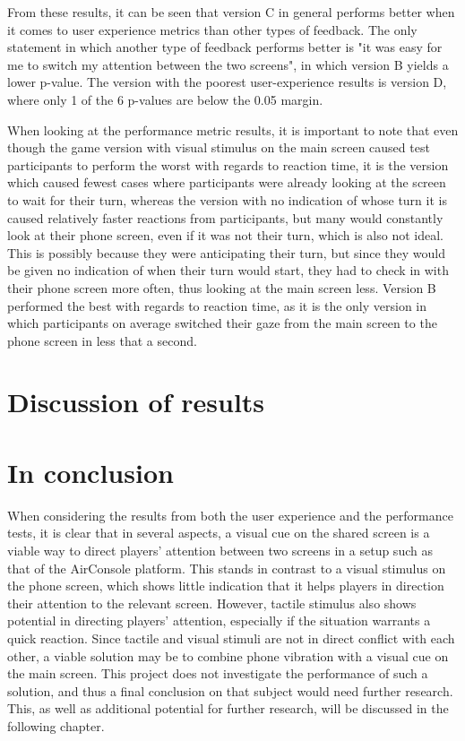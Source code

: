 From these results, it can be seen that version C in general performs better when it comes to user experience metrics than other types of feedback. The only statement in which another type of feedback performs better is "it was easy for me to switch my attention between the two screens", in which version B yields a lower p-value. The version with the poorest user-experience results is version D, where only 1 of the 6 p-values are below the 0.05 margin.

When looking at the performance metric results, it is important to note that even though the game version with visual stimulus on the main screen caused test participants to perform the worst with regards to reaction time, it is the version which caused fewest cases where participants were already looking at the screen to wait for their turn, whereas the version with no indication of whose turn it is caused relatively faster reactions from participants, but many would constantly look at their phone screen, even if it was not their turn, which is also not ideal. This is possibly because they were anticipating their turn, but since they would be given no indication of when their turn would start, they had to check in with their phone screen more often, thus looking at the main screen less. Version B performed the best with regards to reaction time, as it is the only version in which participants on average switched their gaze from the main screen to the phone screen in less that a second.

\section{Discussion of results}


\section{In conclusion}
When considering the results from both the user experience and the performance tests, it is clear that in several aspects, a visual cue on the shared screen is a viable way to direct players' attention between two screens in a setup such as that of the AirConsole platform. This stands in contrast to a visual stimulus on the phone screen, which shows little indication that it helps players in direction their attention to the relevant screen. However, tactile stimulus also shows potential in directing players' attention, especially if the situation warrants a quick reaction. Since tactile and visual stimuli are not in direct conflict with each other, a viable solution may be to combine phone vibration with a visual cue on the main screen. This project does not investigate the performance of such a solution, and thus a final conclusion on that subject would need further research. This, as well as additional potential for further research, will be discussed in the following chapter.